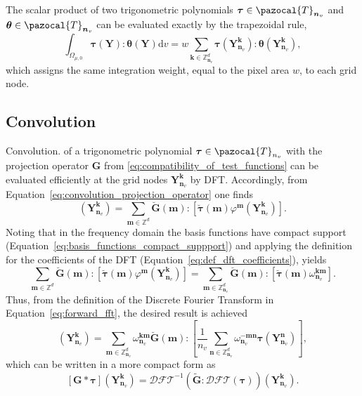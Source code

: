 The scalar product of two trigonometric polynomials \(\bm\tau \in \pazocal{T}_{\bm n_v}\) and \(\bm{\theta} \in \pazocal{T}_{\bm n_v}\) can be evaluated exactly by the trapezoidal rule,
\begin{equation} \label{eq:trapezoidal_rule}
\int_{\Omega_{\mu,0}} \bm\tau(\bm Y): \bm\theta(\bm Y) \mathrm{d} v=w \sum_{\bm{ k} \in \mathbb{Z}_{\bm n_v}^{d}} \bm{\tau}\left(\bm{Y}_{\bm n_v}^{\bm k}\right): \bm{\theta}\left(\bm{Y}_{\bm n_v}^{\bm{ k}}\right),
\end{equation}
which assigns the same integration weight, equal to the pixel area \(w\), to each grid node.

\subsection{Convolution}

Convolution. of a trigonometric polynomial \(\bm\tau \in \pazocal{T}_{n_v}\) with the projection operator \(\bm G\) from \eqref{eq:compatibility_of_test_functions} can be evaluated efficiently at the grid nodes \(\bm Y_{\bm n_v}^{\bm  k}\) by DFT.
Accordingly, from Equation~\eqref{eq:convolution_projection_operator} one finds
\begin{equation}
[\bm{G} * \bm{\tau}]\left(\bm{Y}_{\bm n_v}^{\bm  k}\right) = \sum_{\bm  m \in \mathbb{Z}^{d}} \breve{\bm{G}}(\bm{ m}):\left[\breve{\bm{\tau}}(\bm{ m}) \varphi^{\bm  m}\left(\bm{Y}_{\bm n_v}^{\bm  k}\right)\right].
\end{equation}
Noting that in the frequency domain the basis functions have compact support (Equation~\eqref{eq:basis_functions_compact_suppport}) and applying the definition for the coefficients of the DFT (Equation~\eqref{eq:def_dft_coefficients}), yields
\begin{equation}
  \sum_{\bm  m \in \mathbb{Z}^{d}} \breve{\bm{G}}(\bm{ m}):\left[\breve{\bm{\tau}}(\bm{ m}) \varphi^{\bm  m}\left(\bm{Y}_{\bm n_v}^{\bm  k}\right)\right] = \sum_{\bm  m \in \mathbb{Z}_{\bm n_v}^{d}}  \breve{\bm{G}}(\bm{ m}):\left[\breve{\bm\tau}(\bm{ m}) \omega_{\bm n_v}^{\bm  k \bm  m}\right].
\end{equation}
Thus, from the definition of the Discrete Fourier Transform in Equation~\eqref{eq:forward_fft}, the desired result is achieved
\begin{equation}
[\bm{G} * \bm{\tau}]\left(\bm{Y}_{\bm n_v}^{\bm  k}\right) = \sum_{\bm  m \in \mathbb{Z}_{\bm n_v}^{d}} \omega_{\bm n_v}^{\bm  k \bm  m} \breve{\bm{G}}(\bm{ m}):\left[\frac{1}{n_v} \sum_{\bm  n \in \mathbb{Z}_{\bm n_v}^{d}}
\omega_{\bm n_v}^{-\bm  m \bm  n} \bm{\tau}\left(\bm{Y}_{\bm n_v}^{\bm  n}\right)\right],
\end{equation}
which can be written in a more compact form as
\begin{equation} \label{eq:main_computation_short}
[\bm{G} * \bm{\tau}]\left(\bm{Y}_{\bm n_v}^{\bm  k}\right)= \mathcal{DFT}^{-1}\left(\tilde{\bm G}:\mathcal{DFT}\left(\bm \tau\right)\right)\left(\bm{Y}_{\bm n_v}^{\bm  k}\right).
\end{equation}

